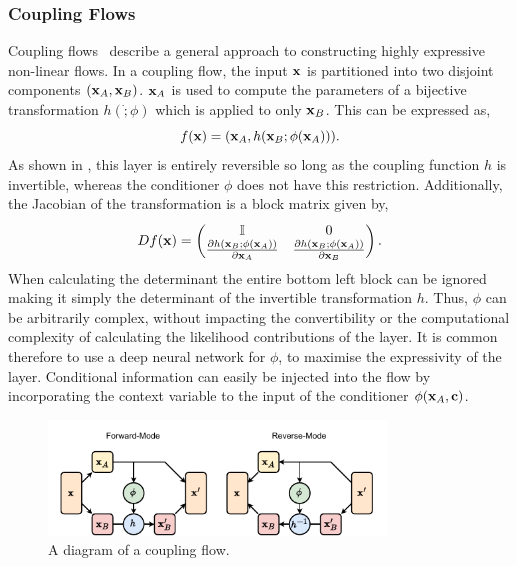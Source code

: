 \subsubsection{Coupling Flows}

Coupling flows~\cite{NICENonlinearIndependent} describe a general approach to constructing highly expressive non-linear flows.
In a coupling flow, the input $\mathbf{x}$ is partitioned into two disjoint components $(\mathbf{x}_A, \mathbf{x}_B)$.
$\mathbf{x}_A$ is used to compute the parameters of a bijective transformation $h(\dot; \phi)$ which is applied to only $\mathbf{x}_B$.
This can be expressed as,
\begin{equation}
    \label{eq:coupling_flow}
    f(\mathbf{x}) = (\mathbf{x}_A, h(\mathbf{x}_B; \phi(\mathbf{x}_A))).
\end{equation}
As shown in , this layer is entirely reversible so long as the coupling function $h$ is invertible, whereas the conditioner $\phi$ does not have this restriction.
Additionally, the Jacobian of the transformation is a block matrix given by,
\begin{equation}
    D f(\mathbf{x}) = \begin{pmatrix}
        \mathbb{I} & 0 \\
        \frac{\partial h(\mathbf{x}_B; \phi(\mathbf{x}_A))}{\partial \mathbf{x}_A} & \frac{\partial h(\mathbf{x}_B; \phi(\mathbf{x}_A))}{\partial \mathbf{x}_B}
    \end{pmatrix}.
\end{equation}
When calculating the determinant the entire bottom left block can be ignored making it simply the determinant of the invertible transformation $h$.
Thus, $\phi$ can be arbitrarily complex, without impacting the convertibility or the computational complexity of calculating the likelihood contributions of the layer.
It is common therefore to use a deep neural network for $\phi$, to maximise the expressivity of the layer.
Conditional information can easily be injected into the flow by incorporating the context variable to the input of the conditioner $\phi(\mathbf{x}_A, \mathbf{c})$.

\begin{figure}[ht]
    \centering
    \includegraphics[width=0.8\textwidth]{Figures/transformers/coupling.pdf}
    \caption{A diagram of a coupling flow.}
    \label{fig:coupling_flow}
\end{figure}

